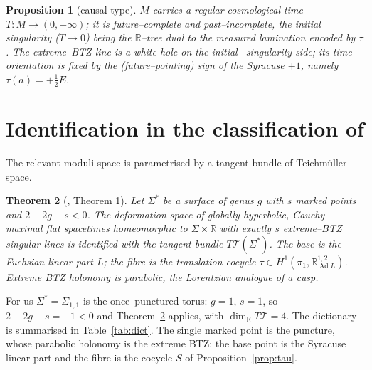 \documentclass[11pt,a4paper]{article}
\theoremstyle{bourbaki}
\newtheorem{thm}{Theorem}[section]
\newtheorem{prop}[thm]{Proposition}
\theoremstyle{bourbakidef}
\newcommand{\R}{\mathbb{R}}
\newcommand{\Teich}{\mathcal{T}}
\DeclareMathOperator{\Ad}{Ad}
\begin{document}
\begin{prop}[causal type]\label{prop:future}
$M$ carries a regular cosmological time $T:M\to(0,+\infty)$; it is future--complete and
past--incomplete, the initial singularity ($T\to0$) being the $\R$--tree dual to the measured
lamination encoded by $\tau$. The extreme--BTZ line is a white hole on the initial--
singularity side; its time orientation is fixed by the (future--pointing) sign of the
Syracuse $+1$, namely $\tau(a)=+\tfrac12E$.
\end{prop}

\section{Identification in the classification of \texorpdfstring{\cite{Brunswic2021}}{Brunswic}}
\label{sec:brunswic}

The relevant moduli space is parametrised by a tangent bundle of Teichm\"uller space.

\begin{thm}[\cite{Brunswic2021}, Theorem 1]\label{thm:brunswic}
Let $\Sigma^\ast$ be a surface of genus $g$ with $s$ marked points and $2-2g-s<0$. The
deformation space of globally hyperbolic, Cauchy--maximal flat spacetimes homeomorphic to
$\Sigma\times\R$ with exactly $s$ extreme--BTZ singular lines is identified with the tangent
bundle $T\Teich(\Sigma^\ast)$. The base is the Fuchsian linear part $L$; the fibre is the
translation cocycle $\tau\in H^1(\pi_1,\R^{1,2}_{\Ad L})$. Extreme BTZ holonomy is parabolic,
the Lorentzian analogue of a cusp.
\end{thm}

For us $\Sigma^\ast=\Sigma_{1,1}$ is the once--punctured torus: $g=1$, $s=1$, so
$2-2g-s=-1<0$ and Theorem~\ref{thm:brunswic} applies, with $\dim_\R T\Teich=4$. The
dictionary is summarised in Table~\ref{tab:dict}. The single marked point is the puncture,
whose parabolic holonomy is the extreme BTZ; the base point is the Syracuse linear part and
the fibre is the cocycle $S$ of Proposition~\ref{prop:tau}.
\end{document}
